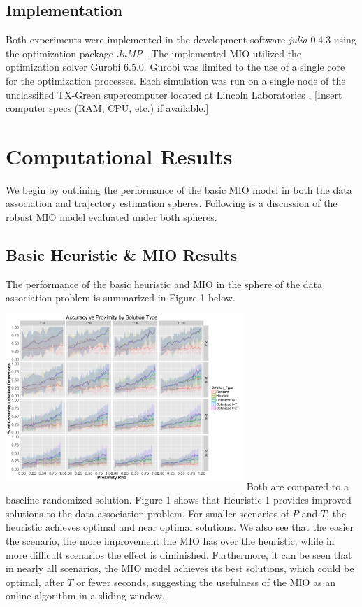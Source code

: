 \documentclass[journal]{IEEEtran}
\begin{document}
\subsection{Implementation}
Both experiments were implemented in the development software \textit{julia} 0.4.3 \cite{julia} using the optimization package \textit{JuMP} \cite{JuMP}. The implemented MIO utilized the optimization solver Gurobi 6.5.0\cite{gurobi}. Gurobi was limited to the use of a single core for the optimization processes. Each simulation was run on a single node of the unclassified TX-Green supercomputer located at Lincoln Laboratories \cite{LLGrid}. [Insert computer specs (RAM, CPU, etc.) if available.]

\section{Computational Results}
We begin by outlining the performance of the basic MIO model in both the data association and trajectory estimation spheres. Following is a discussion of the robust MIO model evaluated under both spheres. 


\subsection{Basic Heuristic \& MIO Results}
The performance of the basic heuristic and MIO in the sphere of the data association problem is summarized in Figure 1 below. 
\includegraphics[width=9cm, height=7cm]{Figure_1}
Both are compared to a baseline randomized solution. Figure 1 shows that Heuristic 1 provides improved solutions to the data association problem.  For smaller scenarios of $P$ and $T$, the heuristic achieves optimal and near optimal solutions. We also see that the easier the scenario, the more improvement the MIO has over the heuristic, while in more difficult scenarios the effect is diminished. Furthermore, it can be seen that in nearly all scenarios, the MIO model achieves its best solutions, which could be optimal, after $T$ or fewer seconds, suggesting the usefulness of the MIO as an online algorithm in a sliding window.
\end{document}
